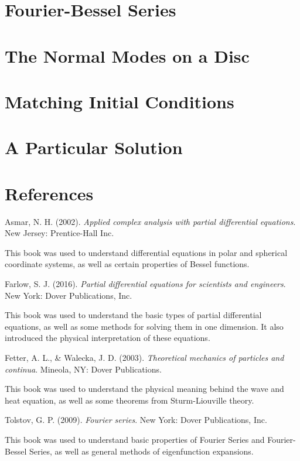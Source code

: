\documentclass{paper}
\begin{document}
\section{Fourier-Bessel Series}
\section{The Normal Modes on a Disc}
\section{Matching Initial Conditions}
\section{A Particular Solution}

\newpage
\section{References}
Asmar, N. H. (2002). \textit{Applied complex analysis with partial differential equations}. New Jersey: Prentice-Hall Inc.\\
\begin{adjustwidth}{2 cm}{}
This book was used to understand differential equations in polar and spherical coordinate systems, as well as certain properties of Bessel functions.\\
\end{adjustwidth}
Farlow, S. J. (2016). \textit{Partial differential equations for scientists and engineers}. New York: Dover Publications, Inc.\\
\begin{adjustwidth}{2 cm}{}
This book was used to understand the basic types of partial differential equations, as well as some methods for solving them in one dimension. It also introduced the physical interpretation of these equations.\\
\end{adjustwidth}
Fetter, A. L., \& Walecka, J. D. (2003). \textit{Theoretical mechanics of particles and continua}. Mineola, NY: Dover Publications. \\
\begin{adjustwidth}{2 cm}{}
This book was used to understand the physical meaning behind the wave and heat equation, as well as some theorems from Sturm-Liouville theory.\\
\end{adjustwidth}
Tolstov, G. P. (2009). \textit{Fourier series}. New York: Dover Publications, Inc.\\
\begin{adjustwidth}{2 cm}{}
This book was used to understand basic properties of Fourier Series and Fourier-Bessel Series, as well as general methods of eigenfunction expansions.
\end{adjustwidth}
\end{document}
